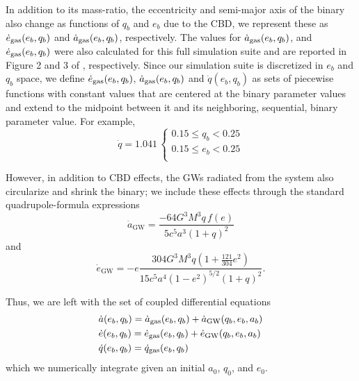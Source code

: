 \documentclass[fleqn,usenatbib]{mnras}
\begin{document}
In addition to its mass-ratio, the eccentricity and semi-major axis of the binary also change as functions of $q_b$ and $e_b$ due to the CBD, we represent these as $\dot{e}_{\rm{gas}}(e_b, q_b)$ and $\dot{a}_{\rm{gas}}(e_b, q_b)$, respectively. The values for $\dot{a}_{\rm{gas}}(e_b, q_b)$, and $\dot{e}_{\rm{gas}}(e_b, q_b)$ were also calculated for this full simulation suite and are reported in Figure 2 and 3 of \citealt{siwek_cbdorbevol}, respectively. Since our simulation suite is discretized in $e_b$ and $q_b$ space, we define $\dot{e}_{\rm{gas}}(e_b, q_b)$, $\dot{a}_{\rm{gas}}(e_b, q_b)$ and $\dot{q}(e_b, q_b)$ as sets of piecewise functions with constant values that are centered at the binary parameter values and extend to the midpoint between it and its neighboring, sequential, binary parameter value. For example,
\begin{equation}
    \dot{q} =1.041 \,
    \begin{cases} 
     0.15 \leq q_b < 0.25 \\
      0.15 \leq e_b < 0.25 \\
\end{cases}
\end{equation}

However, in addition to CBD effects, the GWs radiated from the system also circularize and shrink the binary; we include these effects through the standard quadrupole-formula expressions \citep{peters_64}
\begin{equation}
    \dot{a}_{\text{GW}} = \frac{-64 G^3 M^3 q \, f(e)}{5 c^5 a^3 (1+q)^2}
\end{equation}
and
\begin{equation}
    \dot{e}_{\text{GW}} = -e\frac{ 304 G^3 M^3 q \left( 1 + \frac{121}{304} e^2 \right)}{15 c^5 a^4 \left( 1 - e^2 \right)^{5/2} (1 + q)^2}.
\end{equation}

Thus, we are left with the set of coupled differential equations
\begin{align}\label{eqn:num_integ}
    & \dot{a}(e_b, q_b) = \dot{a}_{\rm{gas}}(e_b, q_b) + \dot{a}_{\rm{GW}}(q_b, e_b, a_b) \\
    & \dot{e}(e_b, q_b) = \dot{e}_{\rm{gas}}(e_b, q_b) + \dot{e}_{\rm{GW}}(q_b, e_b, a_b) \\
    & \dot{q}(e_b, q_b) = \dot{q}_{\rm{gas}}(e_b, q_b) \\
\end{align}
which we numerically integrate given an initial $a_0$, $q_0$, and $e_0$.
\end{document}
